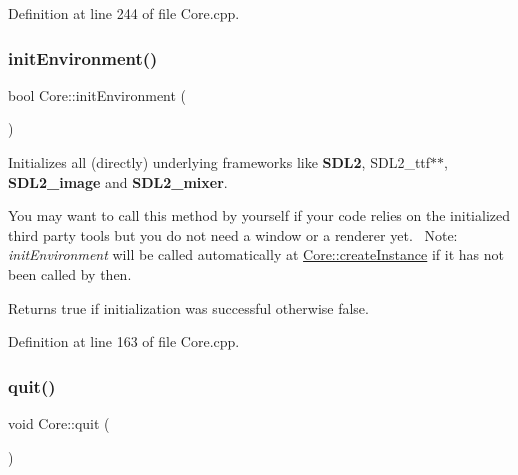 Definition at line 244 of file Core.\+cpp.

\mbox{\label{classbkengine_1_1Core_a05f45aa1489fe4c7c2ebd4506b838a32}} 
\subsubsection{\texorpdfstring{init\+Environment()}{initEnvironment()}}
{\footnotesize\ttfamily bool Core\+::init\+Environment (\begin{DoxyParamCaption}{ }\end{DoxyParamCaption})}



Initializes all (directly) underlying frameworks like {\bfseries S\+D\+L2}, S\+D\+L2\+\_\+ttf$\ast$$\ast$, {\bfseries S\+D\+L2\+\_\+image} and {\bfseries S\+D\+L2\+\_\+mixer}. 

You may want to call this method by yourself if your code relies on the initialized third party tools but you do not need a window or a renderer yet.~\newline
Note\+: {\itshape init\+Environment} will be called automatically at \hyperlink{classbkengine_1_1Core_a8b809ebbd1348ae9b59d49388e7a18f0}{Core\+::create\+Instance} if it has not been called by then.

\begin{DoxyReturn}{Returns}
{\ttfamily true} if initialization was successful otherwise {\ttfamily false}. 
\end{DoxyReturn}


Definition at line 163 of file Core.\+cpp.

\mbox{\label{classbkengine_1_1Core_a7d6ca7943e0aa8d8d33a151fdc131f6e}} 
\subsubsection{\texorpdfstring{quit()}{quit()}}
{\footnotesize\ttfamily void Core\+::quit (\begin{DoxyParamCaption}{ }\end{DoxyParamCaption})\hspace{0.3cm}{\ttfamily [static]}}



